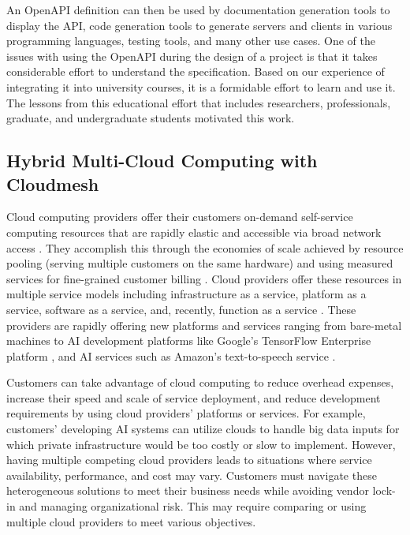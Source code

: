 An OpenAPI definition can then be used by documentation generation tools to display the API, code generation tools to generate servers and clients in various programming languages, testing tools, and many other use cases. One of the issues with using the OpenAPI during the design of a project is that it takes considerable effort to understand the specification. Based on our experience of integrating it into university courses, it is a formidable effort to learn and use it. The lessons from this educational effort that includes researchers, professionals, graduate, and undergraduate students motivated this work.

\subsection{Hybrid Multi-Cloud Computing with Cloudmesh}\label{cloudmesh}

Cloud computing providers offer their customers on-demand self-service
computing resources that are rapidly elastic and accessible via broad
network access \cite{nist-cloud-standard}.
They accomplish this through the economies of scale achieved by resource
pooling (serving multiple customers on the same hardware) and using
measured services for fine-grained customer billing \cite{nist-cloud-standard}.
Cloud providers offer these resources in multiple service models
including infrastructure as a service, platform as a service, software
as a service, and, recently, function as a service
\cite{nist-cloud-standard}.
These providers are rapidly offering new platforms and services ranging
from bare-metal machines to AI development platforms like Google's
TensorFlow Enterprise platform \cite{www-tensorflow-enterprise}, and AI services
such as Amazon's text-to-speech service \cite{amazon-polly}.

Customers can take advantage of cloud computing to reduce overhead
expenses, increase their speed and scale of service deployment, and
reduce development requirements by using cloud providers' platforms or
services. For example, customers' developing AI systems can utilize
clouds to handle big data inputs for which private infrastructure would
be too costly or slow to implement. However, having multiple competing
cloud providers leads to situations where service availability,
performance, and cost may vary. Customers must navigate these
heterogeneous solutions to meet their business needs while avoiding
vendor lock-in and managing organizational risk. This may require
comparing or using multiple cloud providers to meet various objectives.

